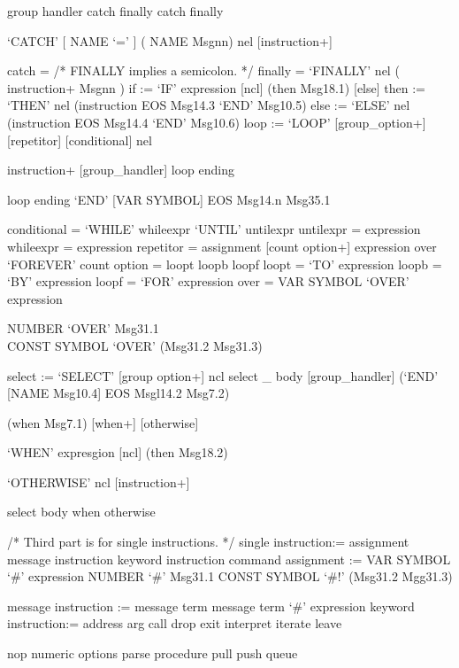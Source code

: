 group handler catch \textbar{} finally catch finally

`CATCH' {[} NAME `=' {]} ( NAME \textbar{} Msgnn) nel {[}instruction+{]}

catch = /* FINALLY implies a semicolon. */ finally = `FINALLY' nel (
instruction+ \textbar{} Msgnn ) if := `IF' expression {[}ncl{]} (then
\textbar{} Msg18.1) {[}else{]} then := `THEN' nel (instruction
\textbar{} EOS Msg14.3 \textbar{} `END' Msg10.5) else := `ELSE' nel
(instruction \textbar{} EOS Msg14.4 \textbar{} `END' Msg10.6) loop :=
`LOOP' {[}group\_option+{]} {[}repetitor{]} {[}conditional{]} nel

instruction+ {[}group\_handler{]} loop ending

loop ending `END' {[}VAR SYMBOL{]} \textbar{} EOS Msg14.n \textbar{}
Msg35.1

conditional = `WHILE' whileexpr \textbar{} `UNTIL' untilexpr untilexpr =
expression whileexpr = expression repetitor = assignment {[}count
option+{]} \textbar{} expression \textbar{} over `FOREVER' count option
= loopt \textbar{} loopb \textbar{} loopf loopt = `TO' expression loopb
= `BY' expression loopf = `FOR' expression over = VAR SYMBOL `OVER'
expression

NUMBER `OVER' Msg31.1\\
CONST SYMBOL `OVER' (Msg31.2 \textbar{} Msg31.3)

select := `SELECT' {[}group option+{]} ncl select \_ body
{[}group\_handler{]} (`END' {[}NAME Msg10.4{]} \textbar{} EOS Msgl14.2
\textbar{} Msg7.2)

(when \textbar{} Msg7.1) {[}when+{]} {[}otherwise{]}

`WHEN' expresgion {[}ncl{]} (then \textbar{} Msg18.2)

`OTHERWISE' ncl {[}instruction+{]}

select body when otherwise

/* Third part is for single instructions. */ single instruction:=
assignment \textbar{} message instruction \textbar{} keyword instruction
\textbar{} command assignment := VAR SYMBOL `\#' expression NUMBER `\#'
Msg31.1 CONST SYMBOL `\#!' (Msg31.2 \textbar{} Mgg31.3)

message instruction := message term \textbar{} message term `\#'
expression keyword instruction:= address \textbar{} arg \textbar{} call
\textbar{} drop \textbar{} exit interpret \textbar{} iterate \textbar{}
leave

nop \textbar{} numeric \textbar{} options parse \textbar{} procedure
\textbar{} pull \textbar{} push \textbar{} queue


